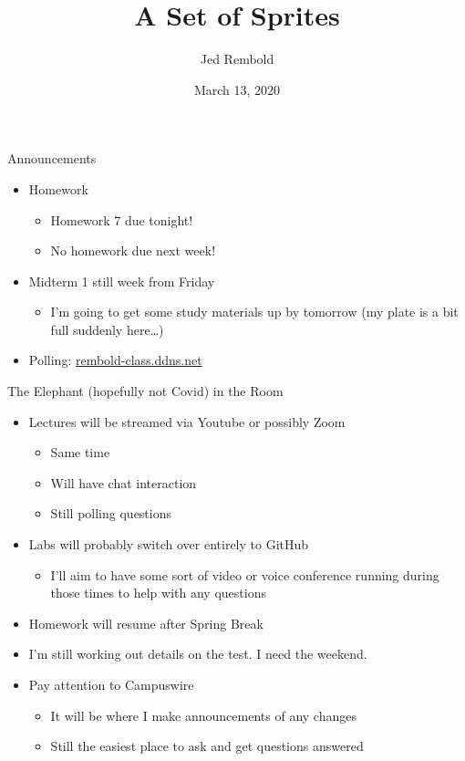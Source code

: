 \documentclass[pdf, aspectratio=169, 12pt]{beamer}
\title{A Set of Sprites}
\author{Jed Rembold}
\date{March 13, 2020}
\begin{document}
\begin{frame}{Announcements}
	\begin{itemize}
		\item Homework
			\begin{itemize}
				\item Homework 7 due tonight!
				\item No homework due next week!
			\end{itemize}
		\item Midterm 1 still week from Friday
			\begin{itemize}
				\item I'm going to get some study materials up by tomorrow (my plate is a bit full suddenly here\ldots)
			\end{itemize}
		\item Polling: \url{rembold-class.ddns.net}
	\end{itemize}
\end{frame}

\begin{frame}{The Elephant {\tiny(hopefully not Covid)} in the Room}
	\begin{itemize}
		\item Lectures will be streamed via Youtube or possibly Zoom
			\begin{itemize}
				\item Same time
				\item Will have chat interaction
				\item Still polling questions
			\end{itemize}
		\item Labs will probably switch over entirely to GitHub
			\begin{itemize}
				\item I'll aim to have some sort of video or voice conference running during those times to help with any questions
			\end{itemize}
		\item Homework will resume after Spring Break
		\item I'm still working out details on the test. I need the weekend.
		\item \alert{Pay attention to Campuswire}
			\begin{itemize}
				\item It will be where I make announcements of any changes
				\item Still the easiest place to ask and get questions answered
			\end{itemize}
	\end{itemize}
\end{frame}
\end{document}
